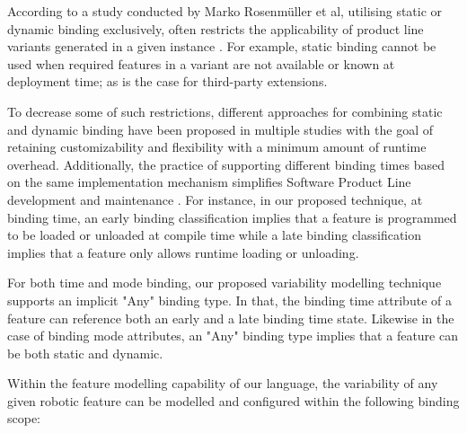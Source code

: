 \documentclass[conference]{IEEEtran}
\begin{document}
According to a study conducted by Marko Rosenmüller et al, utilising static or dynamic binding exclusively, often restricts the applicability of product line variants generated in a given instance \cite{flex-feat-bind}. For example, static binding cannot be used when required features in a variant are not available or known at deployment time; as is the case for third-party extensions. 

To decrease some of such restrictions, different approaches for combining static and dynamic binding have been proposed in multiple studies with the goal of retaining customizability and flexibility with a minimum amount of runtime overhead. Additionally, the practice of supporting different binding times based on the same implementation mechanism simplifies Software Product Line development and maintenance \cite{flex-feat-bind}. For instance, in our proposed technique, at binding time, an early binding classification implies that a feature is programmed to be loaded or unloaded at compile time while a late binding classification implies that a feature only allows runtime loading or unloading.

For both time and mode binding, our proposed variability modelling technique supports an implicit "Any" binding type. In that, the binding time attribute of a feature can reference both an early and a late binding time state. Likewise in the case of binding mode attributes, an "Any" binding type implies that a feature can be both static and dynamic.

Within the feature modelling capability of our language, the variability of any given robotic feature can be modelled and configured within the following binding scope:
\end{document}
